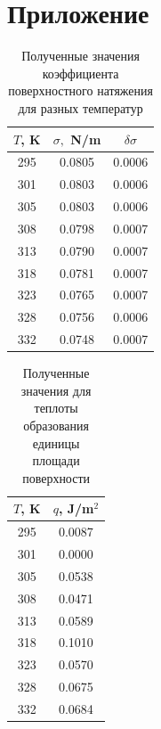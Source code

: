\documentclass[a4paper,12pt]{report}
\begin{document}
    \section{Приложение}
    \begin{table}[H]
        \centering
        \begin{tabular}{|c|c|c|}
            \hline
            $T$, K & $\sigma,$ N/m & $\delta\sigma$ \\
            \hline
            295 & 0.0805 & 0.0006 \\
            \hline
            301 & 0.0803 & 0.0006 \\
            \hline
            305 & 0.0803 & 0.0006 \\
            \hline
            308 & 0.0798 & 0.0007 \\
            \hline
            313 & 0.0790 & 0.0007 \\
            \hline
            318 & 0.0781 & 0.0007 \\
            \hline
            323 & 0.0765 & 0.0007 \\
            \hline
            328 & 0.0756 & 0.0006 \\
            \hline
            332 & 0.0748 & 0.0007 \\
            \hline
        \end{tabular}
    
        \caption{Полученные значения коэффициента поверхностного натяжения для разных температур}
    \end{table}

    \begin{table}[H]
        \centering
        \begin{tabular}{|c|c|}
            \hline
            $T$, K & $q$, J/m$^2$\\
            \hline
            295 & 0.0087 \\
            \hline
            301 & 0.0000 \\
            \hline
            305 & 0.0538 \\
            \hline
            308 & 0.0471 \\
            \hline
            313 & 0.0589 \\
            \hline
            318 & 0.1010 \\
            \hline
            323 & 0.0570 \\
            \hline
            328 & 0.0675 \\
            \hline
            332 & 0.0684 \\
            \hline
        \end{tabular}
        \caption{Полученные значения для теплоты образования единицы площади поверхности}
    \end{table}
\end{document}
